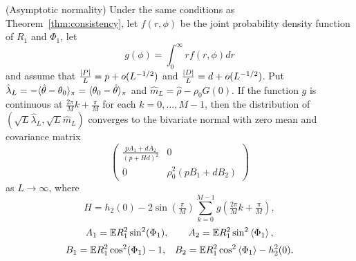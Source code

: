 \documentclass[draftcls, onecolumn, 11pt]{IEEEtran}
\begin{document}
\begin{theorem}\label{thm:normality} (Asymptotic normality)
Under the same conditions as Theorem~\ref{thm:consistency}, let $f(r,\phi)$ be the joint probability density function of $R_1$ and $\Phi_1$, let
\[
g(\phi) = \int_{0}^{\infty} r f(r,\phi) dr %
\]
and assume that $\frac{{\left\vert P \right\vert}}{L} = p + o(L^{-1/2})$ and $\frac{{\left\vert D \right\vert}}{L} = d + o(L^{-1/2})$.
Put $\hat{\lambda}_L = -\langle \hat{\theta} - \theta_0 \rangle_\pi = \langle \theta_0 - \hat{\theta} \rangle_\pi$ and $\hat{m}_L = \hat{\rho} - \rho_0 G(0)$. %
If the function $g$ is continuous at $\tfrac{2\pi}{M}k + \tfrac{\pi}{M}$ for each $k = 0, \dots, M-1$, then the distribution of $(\sqrt{L}\hat{\lambda}_L, \sqrt{L}\hat{m}_L)$ converges to the bivariate normal with zero mean and covariance matrix
\[
\left( \begin{array}{cc} 
\frac{pA_1 + dA_2}{(p + H d)^2} & 0 \\
0 & \rho_0^2(pB_1 + dB_2)
\end{array} \right)
\]
as $L \rightarrow \infty$, where
\[
H = h_2(0) -  2 \sin(\tfrac{\pi}{M}) \sum_{k = 0}^{M-1} g(\tfrac{2\pi}{M}k + \tfrac{\pi}{M}),
\]
\[
A_1 = {\mathbb E} R_1^2\sin^2(\Phi_1), \qquad A_2 = {\mathbb E} R_1^2\sin^2\left\langle \Phi_1 \right\rangle,
\]
\[
B_1 = {\mathbb E} R_1^2 \cos^2(\Phi_1) - 1, \;\;\; B_2 = {\mathbb E} R_1^2 \cos^2\left\langle \Phi_1 \right\rangle - h_2^2(0).
\]
\end{theorem}

\end{document}
